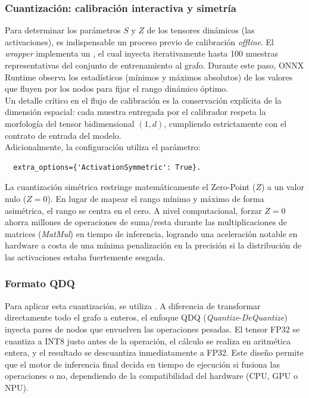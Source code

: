 \documentclass[a4paper,12pt,twoside,final]{book}
\begin{document}
\subsubsection{Cuantización: calibración interactiva y simetría}
Para determinar los parámetros $S$ y $Z$ de los tensores dinámicos (las activaciones), es indispensable un proceso
previo de calibración \textit{offline}. El \textit{wrapper} implementa un , el cual inyecta
iterativamente hasta 100 muestras representativas del conjunto de entrenamiento al grafo. Durante este paso, ONNX
Runtime observa los estadísticos (mínimos y máximos absolutos) de los valores que fluyen por los nodos para fijar el
rango dinámico óptimo.\\

Un detalle crítico en el flujo de calibración es la conservación explícita de la dimensión espacial: cada muestra
entregada por el calibrador respeta la morfología del tensor bidimensional $(1, d)$, cumpliendo estrictamente con el
contrato de entrada del modelo.\\

Adicionalmente, la configuración utiliza el parámetro:
\begin{verbatim}
  extra_options={'ActivationSymmetric': True}.
\end{verbatim}
La cuantización simétrica restringe matemáticamente el Zero-Point ($Z$) a un valor nulo ($Z = 0$). En lugar de mapear
el rango mínimo y máximo de forma asimétrica, el rango se centra en el cero. A nivel computacional, forzar $Z=0$ ahorra
millones de operaciones de suma/resta durante las multiplicaciones de matrices (\textit{MatMul}) en tiempo de
inferencia, logrando una aceleración notable en hardware a costa de una mínima penalización en la precisión si la
distribución de las activaciones estaba fuertemente sesgada.

\subsubsection{Formato QDQ}
Para aplicar esta cuantización, se utiliza . A diferencia de transformar directamente todo el
grafo a enteros, el enfoque QDQ (\textit{Quantize}-\textit{DeQuantize}) inyecta pares de nodos que envuelven las
operaciones pesadas. El tensor FP32 se cuantiza a INT8 justo antes de la operación, el cálculo se realiza en aritmética
entera, y el resultado se descuantiza inmediatamente a FP32. Este diseño permite que el motor de inferencia final
decida en tiempo de ejecución si fusiona las operaciones o no, dependiendo de la compatibilidad del hardware (CPU, GPU
o NPU).
\end{document}
